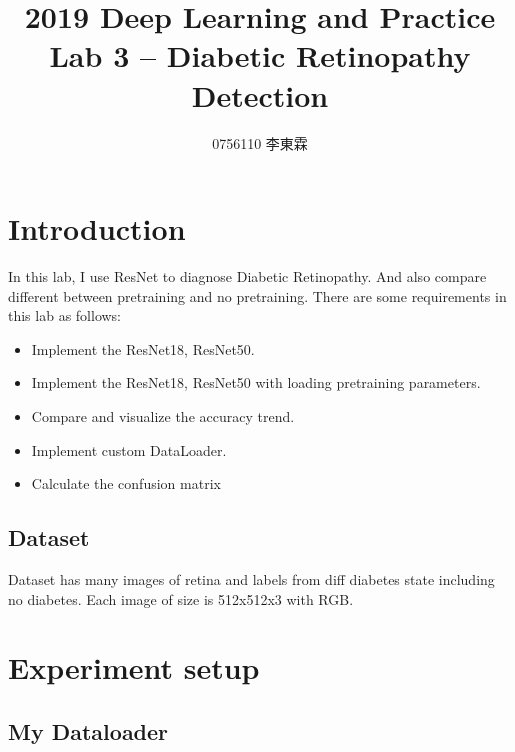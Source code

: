 \documentclass[12pt]{article}
\begin{document}
 
 
\title{2019 Deep Learning and Practice \\ Lab 3 -- Diabetic Retinopathy Detection}
\author{0756110 李東霖}

\maketitle
\section{Introduction}

In this lab, I use ResNet to diagnose Diabetic Retinopathy. And also compare different between pretraining and no pretraining. There are some requirements in this lab as follows:

\begin{itemize}
\item Implement the ResNet18, ResNet50.
\item Implement the ResNet18, ResNet50 with loading pretraining parameters.
\item Compare and visualize the accuracy trend.
\item Implement custom DataLoader.
\item Calculate the confusion matrix
\end{itemize}


\subsection{Dataset}

Dataset has many images of retina and labels from diff diabetes state including no diabetes. Each image of size is 512x512x3 with RGB. 

\section{Experiment setup}

\subsection{My Dataloader}
\end{document}
